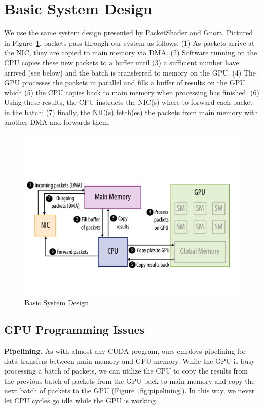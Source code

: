 \section{Basic System Design}

We use the same system design presented by PacketShader and Gnort. Pictured in
Figure~\ref{fig:system}, packets pass through our system as follows: (1) As
packets arrive at the NIC, they are copied to main memory via DMA. (2) Software
running on the CPU copies these new packets to a buffer until (3) a sufficient
number have arrived (see below) and the batch is transferred to memory on the
GPU. (4) The GPU processes the packets in parallel and fills a buffer of
results on the GPU which (5) the CPU copies back to main memory when processing
has finished. (6) Using these results, the CPU instructs the NIC(s) where to
forward each packet in the batch; (7) finally, the NIC(s) fetch(es) the packets
from main memory with another DMA and forwards them.

\begin{figure}
   \centering
   \includegraphics[scale=0.23]{figs/system_overview.pdf} 
   \caption{Basic System Design}
   \label{fig:system}
\end{figure}

\subsection{GPU Programming Issues}
\noindent \textbf{Pipelining.} As with almost any CUDA program, ours employs
pipelining for data transfers between main memory and GPU memory. While the GPU
is busy processing a batch of packets, we can utilize the CPU to copy the
results from the previous batch of packets from the GPU back to main memory and
copy the next batch of packets to the GPU (Figure~\ref{fig:pipelining}). In
this way, we never let CPU cycles go idle while the GPU is working.\\

